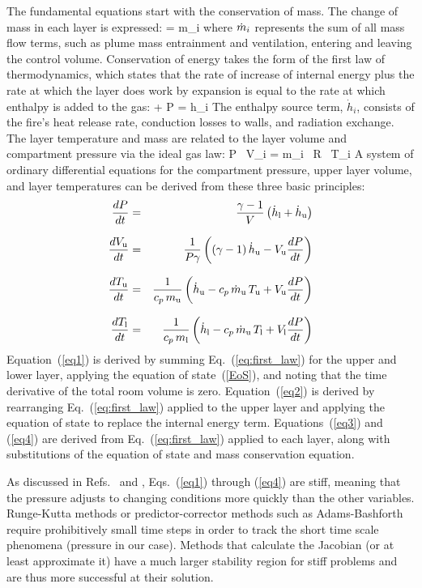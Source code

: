 The fundamental equations start with the conservation of mass. The change of mass in each layer is expressed:
\be
    = \dot m_i  \label{mass_con}
\ee
where $\dot{m}_i$ represents the sum of all mass flow terms, such as plume mass entrainment and ventilation, entering and leaving the control volume. Conservation of energy takes the form of the first law of thermodynamics, which states that the rate of increase of internal energy plus the rate at which the layer does work by expansion is equal to the rate at which enthalpy is added to the gas:
\be
    +  P  =  \dot h_i \label{eq:first_law}
\ee
The enthalpy source term, $\dot h_i$, consists of the fire's heat release rate, conduction losses to walls, and radiation exchange. The layer temperature and mass are related to the layer volume and compartment pressure via the ideal gas law:
\be
  P \, V_i = m_i \, R \, T_i \label{EoS}
\ee
A system of ordinary differential equations for the compartment pressure, upper layer volume, and layer temperatures can be derived from these three basic principles:
\begin{eqnarray}
\frac{d {P}}{dt} &=& \frac{{\gamma-1}}{{V}} \left( \dot{h}_{\rm l} + \dot{h}_{\rm u} \right)  \label{eq1} \\[.1in]
\frac{d {V_{\rm u}}}{dt} &=& \frac{1}{P \gamma} \left( (\gamma-1) \, \dot{h}_{\rm u} - V_{\rm u} \frac{d {P}}{dt} \right) \label{eq2} \\[.1in]
\frac{d {T_{\rm u}}}{dt} &=& \frac{1}{c_p \, m_{\rm u}} \left( \dot{h}_{\rm u} - c_p \, \dot{m}_{\rm u} \, T_{\rm u} + V_{\rm u} \frac{d {P}}{dt} \right) \label{eq3} \\[.1in]
\frac{d {T_{\rm l}}}{dt} &=& \frac{1}{c_p \, m_{\rm l}} \left( \dot{h}_{\rm l} - c_p \, \dot{m}_{\rm u} \, T_{\rm l} + V_{\rm l} \frac{d {P}}{dt} \right) \label{eq4}
\end{eqnarray}
Equation~(\ref{eq1}) is derived by summing Eq.~(\ref{eq:first_law}) for the upper and lower layer, applying the equation of state~(\ref{EoS}), and noting that the time derivative of the total room volume is zero. Equation~(\ref{eq2}) is derived by rearranging Eq.~(\ref{eq:first_law}) applied to the upper layer and applying the equation of state to replace the internal energy term. Equations~(\ref{eq3}) and (\ref{eq4}) are derived from Eq.~(\ref{eq:first_law}) applied to each layer, along with substitutions of the equation of state and mass conservation equation.

As discussed in Refs.~\cite{Forney:1994} and \cite{Rehm:1992}, Eqs.~(\ref{eq1}) through (\ref{eq4}) are stiff, meaning that the pressure adjusts to changing conditions more quickly than the other variables. Runge-Kutta methods or predictor-corrector methods such as Adams-Bashforth require prohibitively small time steps in order to track the short time scale phenomena (pressure in our case). Methods that calculate the Jacobian (or at least approximate it) have a much larger stability region for stiff problems and are thus more successful at their solution.

